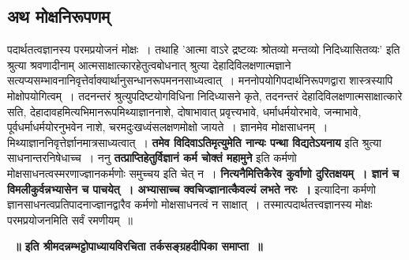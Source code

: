 \subsection*{अथ मोक्षनिरूपणम्}
		पदार्थतत्वज्ञानस्य परमप्रयोजनं मोक्षः~। तथाहि ’आत्मा वाऽरे द्रष्टव्यः श्रोतव्यो मन्तव्यो निदिध्यासितव्यः’ इति श्रुत्या श्रवणादीनाम् आत्मसाक्षात्कारहेतुत्वबोधनात् श्रुत्या देहादिविलक्षणात्मज्ञाने सत्यप्यसम्भावनानिवृत्तेर्वाक्यार्थानुसन्धानरूपमननसाध्यत्वात्~। मननोपयोगिपदार्थनिरूपणद्वारा शास्त्रस्यापि मोक्षोपयोगित्वम्~। तदनन्तरं श्रुत्युपदिष्टयोगविधिना निदिध्यासने कृते, तदनन्तरं देहादिविलक्षणात्मसाक्षात्कारे सति, देहादावहमित्यभिमानरूपमिथ्याज्ञाननाशे, दोषाभावात् प्रवृत्त्यभावे, धर्माधर्मयोरभावे, जन्माभावे, पूर्वधर्माधर्मयोरनुभवेन नाशे, चरमदुःखध्वंसलक्षणमोक्षो जायते~। ज्ञानमेव मोक्षसाधनम्~। मिथ्याज्ञाननिवृत्तेर्ज्ञानमात्रसाध्यत्वात्~। {\bfseries तमेव विदिवाऽतिमृत्युमेति नान्यः पन्था विद्यतेऽयनाय} इति श्रुत्या साधनान्तरनिषेधाच्च~। ननु {\bfseries तत्प्राप्तिहेतुर्विज्ञानं कर्म चोक्तं महामुने} इति कर्मणो मोक्षसाधनत्वस्मरणाज्ज्ञानकर्मणोः समुच्चय इति चेत् न~। {\bfseries नित्यनैमित्तिकैरेव कुर्वाणो दुरितक्षयम्~। ज्ञानं च विमलीकुर्वन्नभ्यासेन च पाचयेत्~। अभ्यासाच्च क्वचिज्ज्ञानात्कैवल्यं लभते नरः~।} इत्यादिना कर्मणो ज्ञानसाधनत्वप्रतिपादनाज्ज्ञानद्वारैव कर्मणो मोक्षसाधनत्वं न साक्षात्~। तस्मात्पदार्थतत्त्वज्ञानस्य मोक्षः परमप्रयोजनमिति सर्वं रमणीयम्~॥
	\begin{center}
	{\bfseries~॥ इति श्रीमदन्नम्भट्टोपाध्यायविरचिता तर्कसङ्ग्रहदीपिका समाप्ता~॥}\\[10pt]
	\end{center}
	
